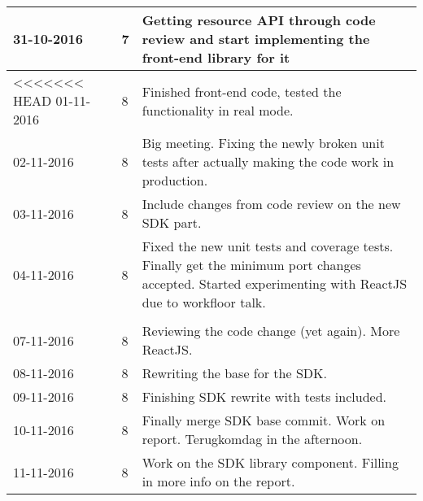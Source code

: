 \begin{tabular}{|p{2cm}|p{1cm}|p{10cm}|}
	\\ \hline
	
	31-10-2016 & 7 & Getting resource API through code review and start implementing the front-end library for it \\ \hline
<<<<<<< HEAD
	01-11-2016 & 8 & Finished front-end code, tested the functionality in real mode. \\ \hline
	02-11-2016 & 8 & Big meeting. Fixing the newly broken unit tests after actually making the code work in production. \\ \hline
	03-11-2016 & 8 & Include changes from code review on the new SDK part. \\ \hline
	04-11-2016 & 8 & Fixed the new unit tests and coverage tests. Finally get the minimum port changes accepted. Started experimenting with ReactJS due to workfloor talk. \\ \hline
	
	\\ \hline
	
	07-11-2016 & 8 & Reviewing the code change (yet again). More ReactJS. \\ \hline
	08-11-2016 & 8 & Rewriting the base for the SDK. \\ \hline
	09-11-2016 & 8 & Finishing SDK rewrite with tests included. \\ \hline
	10-11-2016 & 8 & Finally merge SDK base commit. Work on report. Terugkomdag in the afternoon. \\ \hline
	11-11-2016 & 8 & Work on the SDK library component. Filling in more info on the report. \\ \hline
\end{tabular}

